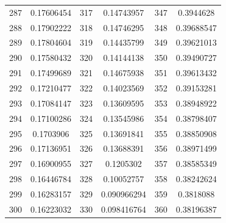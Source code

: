 \documentclass[
	12pt,				%
	openright,			%
	twoside,			%
	a4paper,			%
	english,			%
	french,				%
	spanish,			%
	brazil,				%
	]{abntex2}
\begin{document}
\begin{apendicesenv}
\begin{table}[H]
\begin{tabular}{c c| c c | c c}
287 & 0.17606454 & 317 & 0.14743957 & 347 & 0.3944628\\
288 & 0.17902222 & 318 & 0.14746295 & 348 & 0.39688547\\
289 & 0.17804604 & 319 & 0.14435799 & 349 & 0.39621013\\
290 & 0.17580432 & 320 & 0.14144138 & 350 & 0.39490727\\
291 & 0.17499689 & 321 & 0.14675938 & 351 & 0.39613432\\
292 & 0.17210477 & 322 & 0.14023569 & 352 & 0.39153281\\
293 & 0.17084147 & 323 & 0.13609595 & 353 & 0.38948922\\
294 & 0.17100286 & 324 & 0.13545986 & 354 & 0.38798407\\
295 & 0.1703906 & 325 & 0.13691841 & 355 & 0.38850908\\
296 & 0.17136951 & 326 & 0.13688391 & 356 & 0.38971499\\
297 & 0.16900955 & 327 & 0.1205302 & 357 & 0.38585349\\
298 & 0.16446784 & 328 & 0.10052757 & 358 & 0.38242624\\
299 & 0.16283157 & 329 & 0.090966294 & 359 & 0.3818088\\
300 & 0.16223032 & 330 & 0.098416764 & 360 & 0.38196387
\end{tabular}
\end{table}


\end{apendicesenv}
\end{document}
